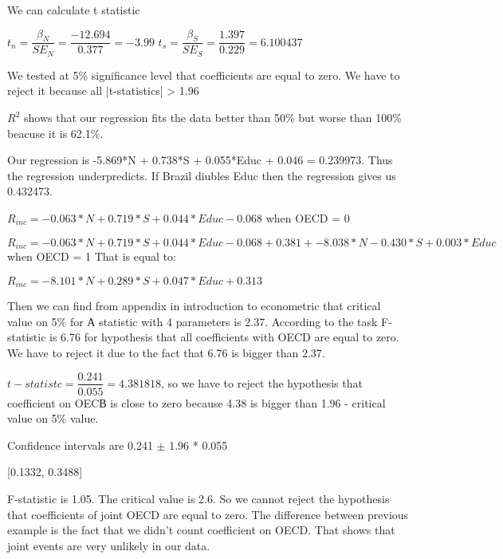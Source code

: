 \documentclass[12pt]{article}
\begin{document}
\begin{list}{()~}{}
\item
We can calculate t statistic

$t_n = \dfrac{\beta_N}{SE_N} = \dfrac{-12.694}{0.377} = -3.99$
$t_s = \dfrac{\beta_S}{SE_S} = \dfrac{1.397}{0.229} = 6.100437$

We tested at 5\% significance level that coefficients are equal to zero. We have to reject it because all |t-statistics| > 1.96

$R^2$ shows that our regression fits the data better than 50\% but worse than 100\% beacuse it is 62.1\%.
\item
Our regression is -5.869*N + 0.738*S + 0.055*Educ + 0.046 = 0.239973.
Thus the regression underpredicts. If Brazil diubles Educ then the regression gives us 0.432473.
\item
$R_{inc} = -0.063 * N + 0.719 * S + 0.044 * Educ -0.068$ when OECD = 0

$R_{inc} = -0.063 * N + 0.719 * S + 0.044 * Educ -0.068 + 0.381 + -8.038 * N - 0.430 * S + 0.003 * Educ$ when OECD = 1
That is equal to: 

$R_{inc} = -8.101 * N + 0.289 * S + 0.047 * Educ  + 0.313$ 

Then we can find from appendix in introduction to econometric that critical value on 5\% for А statistic with 4 parameters is 2.37. According to the task F-statistic is 6.76 for hypothesis that all coefficients with OECD are equal to zero. We have to reject it due to the fact that 6.76 is bigger than 2.37.
\item
$t-statistc = \dfrac{0.241}{0.055}=4.381818$, so we have to reject the hypothesis that coefficient on OECВ is close to zero because 4.38 is bigger than 1.96 - critical value on 5\% value. 

Confidence intervals are 0.241 $\pm$ 1.96 * 0.055

[0.1332, 0.3488]
\item
F-statistic is 1.05. The critical value is 2.6. So we cannot reject the hypothesis that coefficients of joint OECD are equal to zero. The difference between previous example is the fact that we didn't count coefficient on OECD. That shows that joint events are very unlikely in our data.
\end{list}
\medskip		
	
\end{document}
